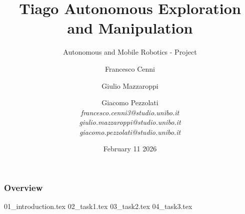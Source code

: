 \documentclass[
	10pt,
	xcolor={dvipsnames}
]{beamer}
\title[Autonomous and Mobile Robotics]{Tiago Autonomous Exploration and Manipulation}
\subtitle{Autonomous and Mobile Robotics - Project}
\author[Cenni, Mazzaroppi, Pezzolati]{
    \small Francesco Cenni \and Giulio Mazzaroppi \and Giacomo Pezzolati \\
    \vspace{1em}
    \footnotesize \textit{francesco.cenni3@studio.unibo.it \\
    giulio.mazzaroppi@studio.unibo.it \\
    giacomo.pezzolati@studio.unibo.it}
}
\institute[UniBO]{
    University of Bologna \\
    \vspace{0.5em}
    Academic Year 2025/2026
}
\date{February 11 2026}
\begin{document}

\begin{frame}
	\titlepage %
\end{frame}



\begin{frame}
	\frametitle{Overview} %
	
	\tableofcontents %
\end{frame}


{01_introduction.tex}
{02_task1.tex}
{03_task2.tex}
{04_task3.tex}

\end{document}
